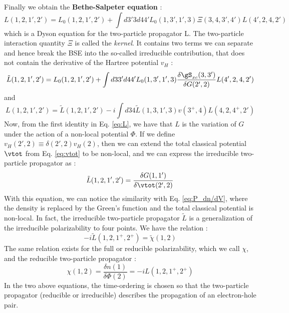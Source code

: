 Finally we obtain the \textbf{Bethe-Salpeter equation} :
\begin{equation}
	L(1,2,1',2') = L_0(1,2,1',2') + \int d3'3d44' L_0(1,3',1',3) \Xi(3,4,3',4') L(4',2,4,2') \label{eq:BSE}
\end{equation}
which is a Dyson equation for the two-particle propagator L. The two-particle interaction quantity $\Xi$ is called the \textit{kernel}. It contains two terms we can separate and hence break the \acrfull{BSE} into the so-called irreducible contribution, that does not contain the derivative of the Hartree potential $v_H$ :
\begin{equation}
	\tilde{L}(1,2,1',2') = L_0(1,2,1',2') + \int d33'd44' L_0(1,3',1',3) \frac{\delta \gS_{xc}(3,3')}{\delta G(2',2)} L(4',2,4,2')
\end{equation} 
and 
\begin{equation}
	L(1,2,1',2') = \tilde{L}(1,2,1',2') -i \int d34 \tilde{L}(1,3,1',3) v(3^+,4) L(4,2,4^+,2')
\end{equation}
Now, from the first identity in Eq. \eqref{eq:L}, we have that $L$ is the variation of $G$ under the action of a non-local potential $\Phi$. If we define $v_H(2',2) \equiv \delta(2',2)v_H(2)$, then we can extend the total classical potential $\vtot$ from Eq. \eqref{eq:vtot} to be non-local, and we can express the irreducible two-particle propagator as :
\begin{equation}
	\tilde{L}(1,2,1',2') = \frac{\delta G(1,1')}{\delta \vtot(2',2)}
\end{equation}
With this equation, we can notice the similarity with Eq. \eqref{eq:P_dn/dV}, where the density is replaced by the Green's function and the total classical potential is non-local. In fact, the irreducible two-particle propagator $\tilde{L}$ is a generalization of the irreducible polarizability to four points. We have the relation :
\begin{equation}
	-i \tilde{L}(1,2,1^+,2^+) = \tilde{\chi}(1,2)
\end{equation}
The same relation exists for the full or reducible polarizability, which we call $\chi$, and the reducible two-particle propagator :
\begin{equation}
	\chi(1,2) = \frac{\delta n(1)}{\delta \Phi(2)} = -i L(1,2,1^+,2^+) \label{eq:chi_iL} 
\end{equation}
In the two above equations, the time-ordering is chosen so that the two-particle propagator (reducible or irreducible) describes the propagation of an electron-hole pair.

